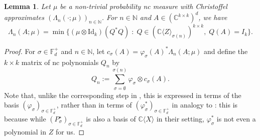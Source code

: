 \documentclass[11pt,reqno]{amsart}
\def\p{\varphi}
\def\s{\sigma}
\def\L{\Lambda}
\def\NN{\mathbb{N}}
\def\CC{\mathbb{C}}
\def\FF{\mathbb{F}}
\newtheorem{lemma}[theorem]{Lemma}
\theoremstyle{definition}
\numberwithin{equation}{section}
\begin{document}
\begin{lemma}
    \label{lem:ChristoffelFunction}
    Let \(\mu\) be a non-trivial probability nc measure with Christoffel approximates \((\L_n(\cdot; \mu))_{n\in\NN}\). For \(n \in \NN\) and \(A \in (\CC^{k\times k})^d\), we have
    \[
        \L_{n}(A; \mu) = \min\{(\mu \otimes \mathrm{Id}_k)(Q^*Q) \; : \; Q \in (\CC\langle Z \rangle_{\s(n)})^{k\times k}, \; Q(A) = I_k\}.
    \]
\end{lemma}
\begin{proof}
    For \(\s \in \FF_d^+\) and \(n \in \NN\), let \(c_\s(A) = \p_\s(A)^*\L_{n}(A; \mu)\) and define the \(k\times k\) matrix of nc polynomials \(Q_n\) by
    \[
        Q_n := \sum_{\s = \emptyset}^{\s(n)} \p_\s \otimes c_\s(A).
    \]
    Note that, unlike the corresponding step in \cite{BMV23}, this is expressed in terms of the basis \((\p_\s)_{\s\in\FF_d^+}\), rather than in terms of \((\p_\s^*)_{\s\in\FF_d^+}\) in analogy to \cite[Theorem 3.4]{BMV23}: this is because while \((P^{\star}_\s)_{\s\in\FF_d^+}\) is also a basis of \(\CC\langle X \rangle\) in their setting, \(\p_\s^*\) is not even a polynomial in \(Z\) for us.


\end{proof}
\end{document}
